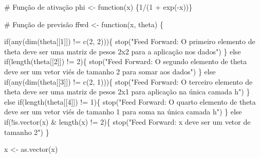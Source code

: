 \documentclass[
  a4paperpaper,
]{article}
\newenvironment{Shaded}{\begin{snugshade}}{\end{snugshade}}
\newcommand{\CommentTok}[1]{\textcolor[rgb]{0.37,0.37,0.37}{#1}}
\newcommand{\ControlFlowTok}[1]{\textcolor[rgb]{0.00,0.23,0.31}{#1}}
\newcommand{\DecValTok}[1]{\textcolor[rgb]{0.68,0.00,0.00}{#1}}
\newcommand{\FunctionTok}[1]{\textcolor[rgb]{0.28,0.35,0.67}{#1}}
\newcommand{\NormalTok}[1]{\textcolor[rgb]{0.00,0.23,0.31}{#1}}
\newcommand{\OtherTok}[1]{\textcolor[rgb]{0.00,0.23,0.31}{#1}}
\newcommand{\SpecialCharTok}[1]{\textcolor[rgb]{0.37,0.37,0.37}{#1}}
\newcommand{\StringTok}[1]{\textcolor[rgb]{0.13,0.47,0.30}{#1}}
\begin{document}
\begin{Shaded}
\begin{Highlighting}[]
\CommentTok{\# Função de ativação}
\NormalTok{phi }\OtherTok{\textless{}{-}} \ControlFlowTok{function}\NormalTok{(x) \{}\DecValTok{1}\SpecialCharTok{/}\NormalTok{(}\DecValTok{1} \SpecialCharTok{+} \FunctionTok{exp}\NormalTok{(}\SpecialCharTok{{-}}\NormalTok{x))\}}

\CommentTok{\# Função de previsão}
\NormalTok{ffwd }\OtherTok{\textless{}{-}} \ControlFlowTok{function}\NormalTok{(x, theta) \{}
  
  \ControlFlowTok{if}\NormalTok{(}\FunctionTok{any}\NormalTok{(}\FunctionTok{dim}\NormalTok{(theta[[}\DecValTok{1}\NormalTok{]]) }\SpecialCharTok{!=} \FunctionTok{c}\NormalTok{(}\DecValTok{2}\NormalTok{, }\DecValTok{2}\NormalTok{)))\{}
    \FunctionTok{stop}\NormalTok{(}\StringTok{"Feed Forward: O primeiro elemento de theta deve ser uma matriz de pesos 2x2 para a aplicação nos dados"}\NormalTok{)}
\NormalTok{  \} }\ControlFlowTok{else} \ControlFlowTok{if}\NormalTok{(}\FunctionTok{length}\NormalTok{(theta[[}\DecValTok{2}\NormalTok{]]) }\SpecialCharTok{!=} \DecValTok{2}\NormalTok{)\{}
    \FunctionTok{stop}\NormalTok{(}\StringTok{"Feed Forward: O segundo elemento de theta deve ser um vetor viés de tamanho 2 para somar aos dados"}\NormalTok{)}
\NormalTok{  \} }\ControlFlowTok{else} \ControlFlowTok{if}\NormalTok{(}\FunctionTok{any}\NormalTok{(}\FunctionTok{dim}\NormalTok{(theta[[}\DecValTok{3}\NormalTok{]]) }\SpecialCharTok{!=} \FunctionTok{c}\NormalTok{(}\DecValTok{2}\NormalTok{, }\DecValTok{1}\NormalTok{)))\{}
    \FunctionTok{stop}\NormalTok{(}\StringTok{"Feed Forward: O terceiro elemento de theta deve ser uma matriz de pesos 2x1 para aplicação na única camada h"}\NormalTok{)}
\NormalTok{  \} }\ControlFlowTok{else} \ControlFlowTok{if}\NormalTok{(}\FunctionTok{length}\NormalTok{(theta[[}\DecValTok{4}\NormalTok{]]) }\SpecialCharTok{!=} \DecValTok{1}\NormalTok{)\{}
    \FunctionTok{stop}\NormalTok{(}\StringTok{"Feed Forward: O quarto elemento de theta deve ser um vetor viés de tamanho 1 para soma na única camada h"}\NormalTok{)}
\NormalTok{  \} }\ControlFlowTok{else} \ControlFlowTok{if}\NormalTok{(}\SpecialCharTok{!}\FunctionTok{is.vector}\NormalTok{(x) }\SpecialCharTok{\&} \FunctionTok{length}\NormalTok{(x) }\SpecialCharTok{!=} \DecValTok{2}\NormalTok{)\{}
    \FunctionTok{stop}\NormalTok{(}\StringTok{"Feed Forward: x deve ser um vetor de tamanho 2"}\NormalTok{)}
\NormalTok{  \}}
  
\NormalTok{  x }\OtherTok{\textless{}{-}} \FunctionTok{as.vector}\NormalTok{(x)}
  

\end{Highlighting}
\end{Shaded}
\end{document}
